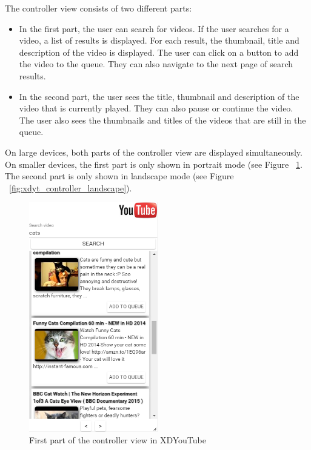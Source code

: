 The controller view consists of two different parts:
\begin{itemize}
	\item In the first part, the user can search for videos. If the user searches for a video, a list of results is displayed. For each result, the thumbnail, title and description of the video is displayed. The user can click on a button to add the video to the queue. They can also navigate to the next page of search results.
	\item In the second part, the user sees the title, thumbnail and description of the video that is currently played. They can also pause or continue the video. The user also sees the thumbnails and titles of the videos that are still in the queue. 
\end{itemize}

On large devices, both parts of the controller view are displayed simultaneously. On smaller devices, the first part is only shown in portrait mode (see Figure ~\ref{fig:xdyt_controller_portrait}. The second part is only shown in landscape mode (see Figure ~\ref{fig:xdyt_controller_landscape}).

\begin{figure}[H]
  \centering
    \includegraphics[width=0.5\textwidth]{images/screenshots/xdyt/controller_portrait.png}
	\caption{First part of the controller view in XDYouTube}
	\label{fig:xdyt_controller_portrait}
\end{figure}

